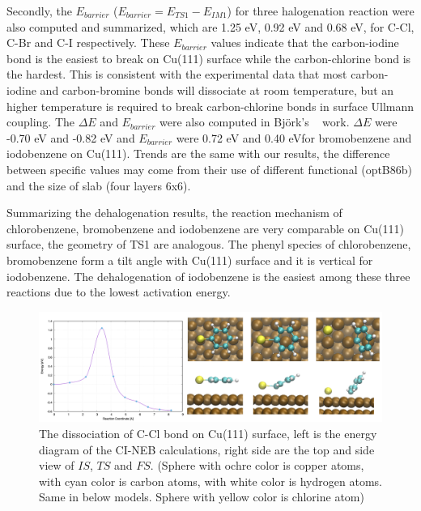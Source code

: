 \documentclass[%
 reprint,
 amsmath,amssymb,
 aps,
prb,
]{revtex4-2}
\begin{document}
Secondly, the $E_{barrier}$ ($E_{barrier} = E_{TS1} - E_{IM1}$) for three halogenation reaction were also computed and summarized, which are 1.25 eV, 0.92 eV and 0.68 eV, for C-Cl, C-Br and C-I respectively. These $E_{barrier}$ values indicate that the carbon-iodine bond is the easiest to break on Cu(111) surface while the carbon-chlorine bond is the hardest. This is consistent with the experimental data that most carbon-iodine and carbon-bromine bonds will dissociate at room temperature, but an higher temperature is required to break carbon-chlorine bonds in surface Ullmann coupling. The $\Delta E$ and $E_{barrier}$ were also computed in Björk's ~\cite{jacs2013} work. $\Delta E$ were -0.70 eV and -0.82 eV and  $E_{barrier}$ were 0.72 eV and 0.40 eVfor bromobenzene and iodobenzene on Cu(111). Trends are the same with our results, the difference between specific values may come from their use of different functional (optB86b) and the size of slab (four layers 6x6).


Summarizing the dehalogenation results, the reaction mechanism of chlorobenzene, bromobenzene and iodobenzene are very comparable on Cu(111) surface, the geometry of TS1 are analogous. The phenyl species of chlorobenzene, bromobenzene form a tilt angle with Cu(111) surface and it is vertical for iodobenzene. The dehalogenation of iodobenzene is the easiest among these three reactions due to the lowest activation energy.

\begin{figure}[hbt]
\centering
\includegraphics[width=1.0\textwidth]{Fig/dissociation_Cl.png}
\caption{The dissociation of C-Cl bond on Cu(111) surface, left is the energy diagram of the CI-NEB calculations, right side are the top and side view of $IS$, $TS$ and $FS$. (Sphere with ochre color is copper atoms, with cyan color is carbon atoms, with white color is hydrogen atoms. Same in below models. Sphere with yellow color is chlorine atom)}
\label{fig:dissociation_Cl}
\end{figure}
\end{document}
